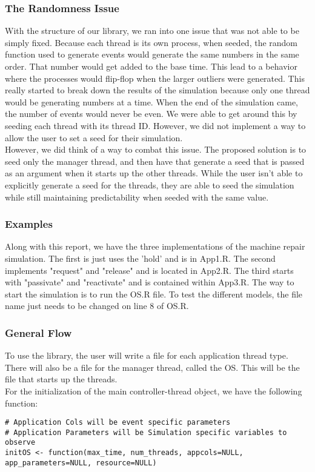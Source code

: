 \documentclass[fleqn]{article}
\begin{document}
\subsubsection{The Randomness Issue} With the structure of our library, we ran into one issue that was not able to be simply fixed. Because each thread is its own process, when seeded, the random function used to generate events would generate the same numbers in the same order. That number would get added to the base time. This lead to a behavior where the processes would flip-flop when the larger outliers were generated. This really started to break down the results of the simulation because only one thread would be generating numbers at a time. When the end of the simulation came, the number of events would never be even. We were able to get around this by seeding each thread with its thread ID. However, we did not implement a way to allow the user to set a seed for their simulation. \\
However, we did think of a way to combat this issue. The proposed solution is to seed only the manager thread, and then have that generate a seed that is passed as an argument when it starts up the other threads. While the user isn't able to explicitly generate a seed for the threads, they are able to seed the simulation while still maintaining predictability when seeded with the same value.

\subsubsection{Examples} Along with this report, we have the three implementations of the machine repair simulation. The first is just uses the 'hold' and is in App1.R. The second implements "request" and "release" and is located in App2.R. The third starts with "passivate" and "reactivate" and is contained within App3.R. The way to start the simulation is to run the OS.R file. To test the different models, the file name just needs to be changed on line 8 of OS.R.

\subsubsection{General Flow}
To use the library, the user will write a file for each application thread type. There will also be a file for the manager thread, called the OS. This will be the file that starts up the threads.\\

For the initialization of the main controller-thread object, we have the following function:
\begin{lstlisting}
# Application Cols will be event specific parameters
# Application Parameters will be Simulation specific variables to observe
initOS <- function(max_time, num_threads, appcols=NULL, app_parameters=NULL, resource=NULL)
\end{lstlisting}
\end{document}
